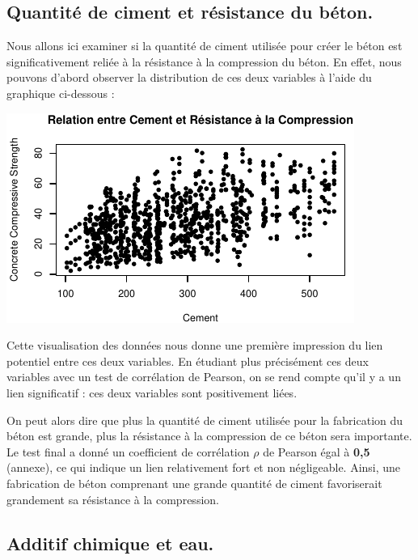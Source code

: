 \documentclass[
  12pt,
]{article}
\begin{document}
\subsection{Quantité de ciment et résistance du
béton.}\label{quantituxe9-de-ciment-et-ruxe9sistance-du-buxe9ton.}

Nous allons ici examiner si la quantité de ciment utilisée pour créer le
béton est significativement reliée à la résistance à la compression du
béton. En effet, nous pouvons d'abord observer la distribution de ces
deux variables à l'aide du graphique ci-dessous :

\begin{center}\includegraphics{rmd_final_files/figure-latex/unnamed-chunk-9-1} \end{center}

Cette visualisation des données nous donne une première impression du
lien potentiel entre ces deux variables. En étudiant plus précisément
ces deux variables avec un test de corrélation de Pearson, on se rend
compte qu'il y a un lien significatif : ces deux variables sont
positivement liées.

On peut alors dire que plus la quantité de ciment utilisée pour la
fabrication du béton est grande, plus la résistance à la compression de
ce béton sera importante. Le test final a donné un coefficient de
corrélation \(\rho\) de Pearson égal à \textbf{0,5} (annexe), ce qui
indique un lien relativement fort et non négligeable. Ainsi, une
fabrication de béton comprenant une grande quantité de ciment
favoriserait grandement sa résistance à la compression.

\subsection{Additif chimique et eau.}\label{additif-chimique-et-eau.}
\end{document}
